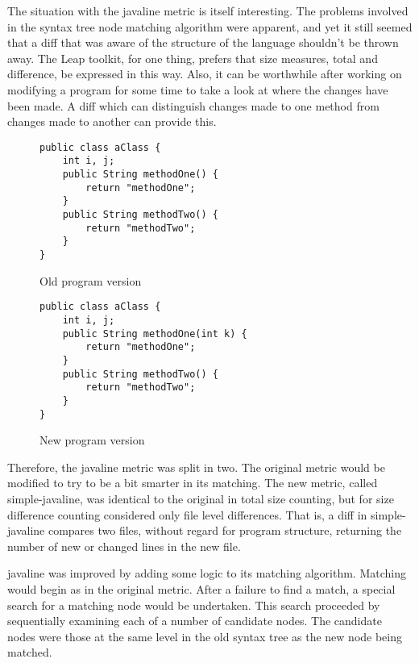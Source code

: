 The situation with the {\sc javaline} metric is itself interesting.
The problems involved in the syntax tree node matching algorithm were
apparent, and yet it still seemed that a diff that was aware of the
structure of the language shouldn't be thrown away.  The Leap toolkit, 
for one thing, prefers that size measures, total and difference, be
expressed in this way.  Also, it can be worthwhile after working on
modifying a program for some time to take a look at where the changes
have been made.  A diff which can distinguish changes made to one
method from changes made to another can provide this.

\singlespace
\begin{figure}
  \centering
  \begin{verbatim}
public class aClass {
    int i, j;
    public String methodOne() {
        return "methodOne";
    }
    public String methodTwo() {
        return "methodTwo";
    }
}
\end{verbatim}
  \caption{Old program version}
  \label{old-version2}
\end{figure}

\begin{figure}
  \centering
  \begin{verbatim}
public class aClass {
    int i, j;
    public String methodOne(int k) {
        return "methodOne";
    }
    public String methodTwo() {
        return "methodTwo";
    }
}
\end{verbatim}
  \caption{New program version}
  \label{new-version2}
\end{figure}
\doublespace

Therefore, the {\sc javaline} metric was split in two.  The original
metric would be modified to try to be a bit smarter in its matching.
The new metric, called {\sc simple-javaline}, was identical to the
original in total size counting, but for size difference counting
considered only file level differences.  That is, a diff in {\sc
  simple-javaline} compares two files, without regard for program
structure, returning the number of new or changed lines in the new
file.

{\sc javaline} was improved by adding some logic to its matching
algorithm.  Matching would begin as in the original metric.  After a
failure to find a match, a special search for a matching node would be
undertaken.  This search proceeded by sequentially examining each of a 
number of candidate nodes.  The candidate nodes were those at the same
level in the old syntax tree as the new node being matched.



